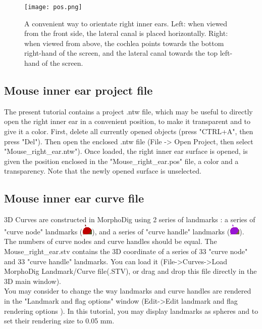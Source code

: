\documentclass[12pt, a4paper]{book}
\begin{document}
\begin{figure}
  \centering
  \texttt{[image: pos.png]} 
	\caption{A convenient way to orientate right inner ears.  Left: when viewed from the front side, the lateral canal is placed horizontally. Right: when viewed from above, the cochlea points towards the bottom right-hand of the screen, and the lateral canal towards the top left-hand of the screen.}
\label{orientation}
 
\end{figure}


\subsection{Mouse inner ear project file}
The present tutorial contains a project .ntw file, which may be useful to directly open the right inner ear
 in a convenient position, to make it transparent and to give it a color. First, delete all currently opened objects
(press "CTRL+A", then press "Del"). Then open the enclosed .ntw file (File -> Open Project, then select
"Mouse\_right\_ear.ntw"). Once loaded, the right inner ear surface is opened, is given the position
enclosed in the "Mouse\_right\_ear.pos" file, a color and a transparency. Note that the newly opened
surface is unselected.\\

\subsection{Mouse inner ear curve file}
3D Curves are constructed in MorphoDig using 2 series of landmarks : a series of "curve node" landmarks (\includegraphics[scale=0.7]{../images/04/curve_nodes.png}),
and a series of "curve handle" landmarks (\includegraphics[scale=0.7]{../images/04/curve_handles.png}). The numbers of curve nodes and curve handles should be equal. The Mouse\_right\_ear.stv contains the 3D coordinate of a series of  33 "curve node" and 33 "curve handle" landmarks. You can load it (File->Curves->Load MorphoDig Landmark/Curve file(.STV), or drag and drop this file directly in the 3D main window).\\

You may consider to change the way landmarks and curve handles are rendered in the "Landmark and flag options" window (Edit->Edit landmark and flag rendering options ). In this tutorial, you may display landmarks as spheres and to set their rendering size to 0.05 mm.\\
\end{document}
